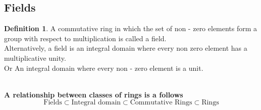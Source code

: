 \documentclass[11pt,a4paper]{article}
\theoremstyle{definition}
\newtheorem{defn}[thm]{Definition}
\begin{document}
\subsection{Fields}

\begin{defn}
A commutative ring in which the set of non - zero elements form a group with respect to multiplication is called a field.\\


Alternatively, a field is an integral domain where every non zero element has a multiplicative unity.\\

Or  An integral domain where every non - zero element is a unit.\\\\
\end{defn}



\textbf{A relationship between classes of rings is a follows}
$$\text{Fields} \subset \text{Integral domain} \subset \text{Commutative Rings} \subset \text{Rings}$$\\
\end{document}
